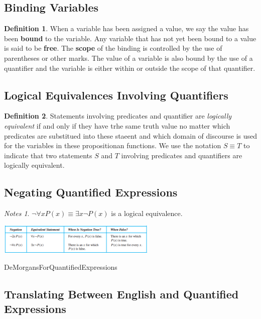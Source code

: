 \documentclass[11pt]{book} %
\theoremstyle {definition}
\newtheorem {definition}{Definition}[section]
\theoremstyle {remark}
\newtheorem*{notes}{Notes}
\begin{document}
    \subsection {Binding Variables}
\begin{definition}
When a variable has been assigned a value, we say the value has been \textbf{bound} to the variable. Any variable that has not yet been bound to a value is said to be \textbf{free}. The \textbf{scope} of the binding is controlled by the use of parentheses or other marks. The value of a variable is also bound by the use of a quantifier and the variable is either within or outside the scope of that quantifier.
\end{definition}

    \subsection {Logical Equivalences Involving Quantifiers}
\begin{definition}
Statements involving predicates and quantifier are \textit{logically equivalent} if and only if they have trhe same truth value no matter which predicates are substitued into these staeent and which domain of discourse is used for the variables in these propositionan functions. We use the notation $S \equiv T$ to indicate that two statements $S$ and $T$ involving predicates and quantifiers are logically equivalent.
\end{definition}

    \subsection {Negating Quantified Expressions}
\begin{notes}
$\neg \forall x P(x) \equiv \exists x \neg P(x)$ is a logical equivalence.
\end{notes}
    
    \begin{table}[htbp]
  \includegraphics [width=3in]{DeMorgansForQuantifiedExpressions}
  \caption{DeMorgansForQuantifiedExpressions}
  \label{table:DeMorgansForQuantifiedExpressions}
  \end{table}
    

    \subsection {Translating Between English and Quantified Expressions}
\end{document}
